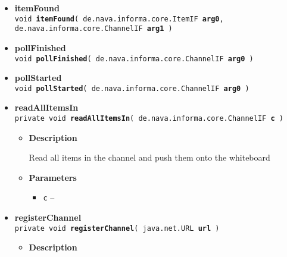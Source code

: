 {{{\begin{itemize}
{\begin{itemize}
{Creates a Story object with the contents of the item and posts it to Psyclone
}
\item{
{\bf Parameters}
  \begin{itemize}
   \item{
{\tt item} -- }
  \end{itemize}
}%
\end{itemize}
}%
 \item{ 
{\bf itemFound}\\
{\tt  void\ {\bf itemFound}( {\tt de.nava.informa.core.ItemIF} {\bf arg0},
{\tt de.nava.informa.core.ChannelIF} {\bf arg1} )
\label{amber.crawler.RSS.itemFound(de.nava.informa.core.ItemIF, de.nava.informa.core.ChannelIF)}}%
}%
 \item{ 
{\bf pollFinished}\\
{\tt  void\ {\bf pollFinished}( {\tt de.nava.informa.core.ChannelIF} {\bf arg0} )
\label{amber.crawler.RSS.pollFinished(de.nava.informa.core.ChannelIF)}}%
}%
 \item{ 
{\bf pollStarted}\\
{\tt  void\ {\bf pollStarted}( {\tt de.nava.informa.core.ChannelIF} {\bf arg0} )
\label{amber.crawler.RSS.pollStarted(de.nava.informa.core.ChannelIF)}}%
}%
 \item{ 
{\bf readAllItemsIn}\\
{\tt private void\ {\bf readAllItemsIn}( {\tt de.nava.informa.core.ChannelIF} {\bf c} )
\label{amber.crawler.RSS.readAllItemsIn(de.nava.informa.core.ChannelIF)}}%
\begin{itemize}
\item{
{\bf Description}

Read all items in the channel and push them onto the whiteboard
}
\item{
{\bf Parameters}
  \begin{itemize}
   \item{
{\tt c} -- }
  \end{itemize}
}%
\end{itemize}
}%
 \item{ 
{\bf registerChannel}\\
{\tt private void\ {\bf registerChannel}( {\tt java.net.URL} {\bf url} )
\label{amber.crawler.RSS.registerChannel(java.net.URL)}}%
\begin{itemize}
\item{
{\bf Description}

}
\end{itemize}}
\end{itemize}}}}
